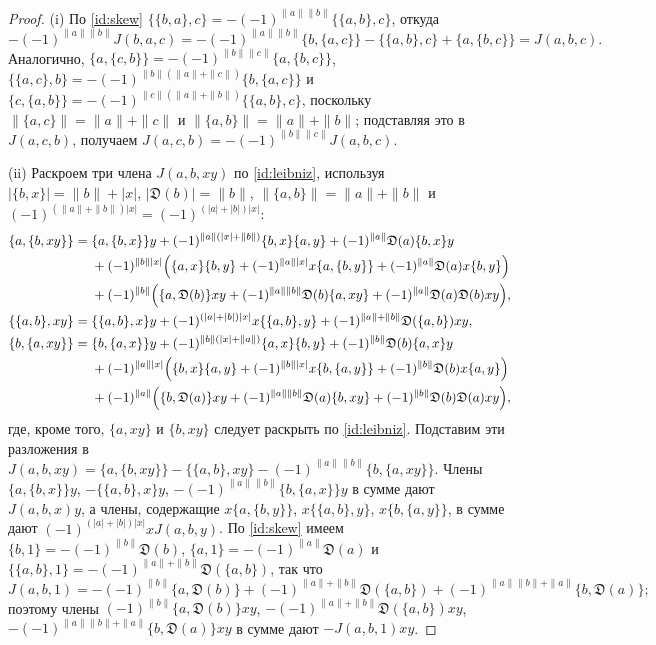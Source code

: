 \documentclass[11pt,reqno]{amsart}
\newcommand{\D}{\mathfrak D}
\newcommand{\rp}[1]{\|#1\|}
\theoremstyle{plain}
\theoremstyle{definition}
\theoremstyle{remark}
\begin{document}
\begin{proof}
(i) По \eqref{id:skew} $\{\{b,a\},c\}=-(-1)^{\rp a\rp b}\{\{a,b\},c\}$, откуда
$$
-(-1)^{\rp a\rp b}J(b,a,c)=-(-1)^{\rp a\rp b}\{b,\{a,c\}\}-\{\{a,b\},c\}+\{a,\{b,c\}\}=J(a,b,c).
$$
Аналогично, $\{a,\{c,b\}\}=-(-1)^{\rp b\rp c}\{a,\{b,c\}\}$, $\{\{a,c\},b\}=-(-1)^{\rp b(\rp a+\rp c)}\{b,\{a,c\}\}$ и $\{c,\{a,b\}\}=-(-1)^{\rp c(\rp a+\rp b)}\{\{a,b\},c\}$, поскольку $\rp{\{a,c\}}=\rp a+\rp c$ и $\rp{\{a,b\}}=\rp a+\rp b$; подставляя это в $J(a,c,b)$, получаем $J(a,c,b)=-(-1)^{\rp b\rp c}J(a,b,c)$.

(ii) Раскроем три члена $J(a,b,xy)$ по \eqref{id:leibniz}, используя $|\{b,x\}|=\rp b+|x|$, $|\D(b)|=\rp b$, $\rp{\{a,b\}}=\rp a+\rp b$ и $(-1)^{(\rp a+\rp b)|x|}=(-1)^{(|a|+|b|)|x|}$:
\begin{align*}
\{a,\{b,xy\}\}={}&\{a,\{b,x\}\}y+(-1)^{\rp a(|x|+\rp b)}\{b,x\}\{a,y\}+(-1)^{\rp a}\D(a)\{b,x\}y\\
&+(-1)^{\rp b|x|}\Bigl(\{a,x\}\{b,y\}+(-1)^{\rp a|x|}x\{a,\{b,y\}\}+(-1)^{\rp a}\D(a)x\{b,y\}\Bigr)\\
&+(-1)^{\rp b}\Bigl(\{a,\D(b)\}xy+(-1)^{\rp a\rp b}\D(b)\{a,xy\}+(-1)^{\rp a}\D(a)\D(b)xy\Bigr),\\
\{\{a,b\},xy\}={}&\{\{a,b\},x\}y+(-1)^{(|a|+|b|)|x|}x\{\{a,b\},y\}+(-1)^{\rp a+\rp b}\D(\{a,b\})xy,\\
\{b,\{a,xy\}\}={}&\{b,\{a,x\}\}y+(-1)^{\rp b(|x|+\rp a)}\{a,x\}\{b,y\}+(-1)^{\rp b}\D(b)\{a,x\}y\\
&+(-1)^{\rp a|x|}\Bigl(\{b,x\}\{a,y\}+(-1)^{\rp b|x|}x\{b,\{a,y\}\}+(-1)^{\rp b}\D(b)x\{a,y\}\Bigr)\\
&+(-1)^{\rp a}\Bigl(\{b,\D(a)\}xy+(-1)^{\rp a\rp b}\D(a)\{b,xy\}+(-1)^{\rp b}\D(b)\D(a)xy\Bigr),
\end{align*}
где, кроме того, $\{a,xy\}$ и $\{b,xy\}$ следует раскрыть по \eqref{id:leibniz}.
Подставим эти разложения в $J(a,b,xy)=\{a,\{b,xy\}\}-\{\{a,b\},xy\}-(-1)^{\rp a\rp b}\{b,\{a,xy\}\}$.
Члены $\{a,\{b,x\}\}y$, $-\{\{a,b\},x\}y$, $-(-1)^{\rp a\rp b}\{b,\{a,x\}\}y$ в сумме дают $J(a,b,x)y$, а члены, содержащие $x\{a,\{b,y\}\}$, $x\{\{a,b\},y\}$, $x\{b,\{a,y\}\}$, в сумме дают $(-1)^{(|a|+|b|)|x|}xJ(a,b,y)$.
По \eqref{id:skew} имеем $\{b,1\}=-(-1)^{\rp b}\D(b)$, $\{a,1\}=-(-1)^{\rp a}\D(a)$ и $\{\{a,b\},1\}=-(-1)^{\rp a+\rp b}\D(\{a,b\})$, так что
$$
J(a,b,1)=-(-1)^{\rp b}\{a,\D(b)\}+(-1)^{\rp a+\rp b}\D(\{a,b\})+(-1)^{\rp a\rp b+\rp a}\{b,\D(a)\};
$$
поэтому члены $(-1)^{\rp b}\{a,\D(b)\}xy$, $-(-1)^{\rp a+\rp b}\D(\{a,b\})xy$, $-(-1)^{\rp a\rp b+\rp a}\{b,\D(a)\}xy$ в сумме дают $-J(a,b,1)xy$.

\end{proof}
\end{document}
